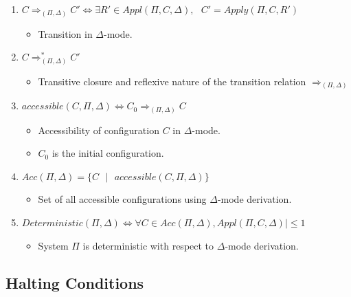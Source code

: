 \documentclass{article}
\newcommand{\s}{\text{ }}
\begin{document}
\begin{appendices}
\begin{enumerate}
   \item $C \Rightarrow_{(\Pi, \Delta)} C' \Leftrightarrow \exists R' \in Appl(\Pi,C,\Delta),\s C'=Apply(\Pi,C,R')$
         \begin{itemize}
         \item Transition in $\Delta$-mode.
         \end{itemize}
   \item $C \Rightarrow_{(\Pi, \Delta)}^{*} C'$
         \begin{itemize}
         \item Transitive closure and reflexive nature of the transition relation $\Rightarrow_{(\Pi,\Delta)}$
         \end{itemize}
   \item $accessible(C,\Pi, \Delta) \Leftrightarrow C_0 \Rightarrow_{(\Pi, \Delta)} C$
         \begin{itemize}
         \item Accessibility of configuration $C$ in $\Delta$-mode.
         \item $C_0$  is the initial configuration.
         \end{itemize}
   \item $Acc(\Pi, \Delta) = \{C \s | \s accessible(C, \Pi, \Delta)\}$ 
         \begin{itemize}
         \item Set of all accessible configurations using $\Delta$-mode derivation. 
         \end{itemize}
   \item $Deterministic(\Pi, \Delta) \Leftrightarrow \forall C \in Acc(\Pi, \Delta), Appl(\Pi, C, \Delta)| \leq 1$ 
         \begin{itemize}
         \item System $\Pi$ is deterministic with respect to $\Delta$-mode derivation.
         \end{itemize}
\end{enumerate}


\subsection{Halting Conditions} \label{a-ff1-halt}


\end{appendices}
\end{document}

